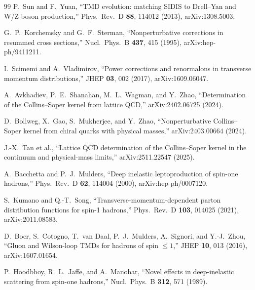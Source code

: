 \documentclass[11pt]{article}
\begin{document}
\begin{thebibliography}{99}
P.~Sun and F.~Yuan,
``TMD evolution: matching SIDIS to Drell--Yan and W/Z boson production,''
Phys.\ Rev.\ D \textbf{88}, 114012 (2013), arXiv:1308.5003.

G.~P.~Korchemsky and G.~F.~Sterman,
``Nonperturbative corrections in resummed cross sections,''
Nucl.\ Phys.\ B \textbf{437}, 415 (1995), arXiv:hep-ph/9411211.

I.~Scimemi and A.~Vladimirov,
``Power corrections and renormalons in transverse momentum distributions,''
JHEP \textbf{03}, 002 (2017), arXiv:1609.06047.

A.~Avkhadiev, P.~E.~Shanahan, M.~L.~Wagman, and Y.~Zhao,
``Determination of the Collins--Soper kernel from lattice QCD,''
arXiv:2402.06725 (2024).

D.~Bollweg, X.~Gao, S.~Mukherjee, and Y.~Zhao,
``Nonperturbative Collins--Soper kernel from chiral quarks with physical
masses,''
arXiv:2403.00664 (2024).

J.-X.~Tan et al.,
``Lattice QCD determination of the Collins--Soper kernel in the continuum and
physical-mass limits,''
arXiv:2511.22547 (2025).

A.~Bacchetta and P.~J.~Mulders,
``Deep inelastic leptoproduction of spin-one hadrons,''
Phys.\ Rev.\ D \textbf{62}, 114004 (2000), arXiv:hep-ph/0007120.

S.~Kumano and Q.-T.~Song,
``Transverse-momentum-dependent parton distribution functions for spin-1
hadrons,''
Phys.\ Rev.\ D \textbf{103}, 014025 (2021), arXiv:2011.08583.

D.~Boer, S.~Cotogno, T.~van Daal, P.~J.~Mulders, A.~Signori, and Y.-J.~Zhou,
``Gluon and Wilson-loop TMDs for hadrons of spin \(\leq1\),''
JHEP \textbf{10}, 013 (2016), arXiv:1607.01654.

P.~Hoodbhoy, R.~L.~Jaffe, and A.~Manohar,
``Novel effects in deep-inelastic scattering from spin-one hadrons,''
Nucl.\ Phys.\ B \textbf{312}, 571 (1989).

\end{thebibliography}
\end{document}
